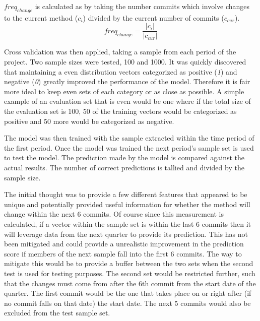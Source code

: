 $freq_{change}$ is calculated as by taking the number commits which involve changes to the current method ($c_i$) divided by the current number of commits ($c_{cur}$).
\begin{equation}
\label{eq:freq_change}
freq_{change} = \frac{|c_i|}{|c_{cur}|}
\end{equation}



Cross validation was then applied, taking a sample from each period of the project. Two sample sizes were tested, 100 and 1000. It was quickly discovered that maintaining a even distribution vectors categorized as positive (\textit{1}) and negative (\textit{0}) greatly improved the performance of the model. Therefore it is fair more ideal to keep even sets of each category or as close as possible. A simple example of an evaluation set that is even would be one where if the total size of the evaluation set is 100, 50 of the training vectors would be categorized as positive and 50 more would be categorized as negative.

The model was then trained with the sample extracted within the time period of the first period. Once the model was trained the next period's sample set is used to test the model. The prediction made by the model is compared against the actual results. The number of correct predictions is tallied and divided by the sample size. 


The initial thought was to provide a few different features that appeared to be unique and potentially provided useful information for whether the method will change within the next 6 commits. Of course since this measurement is calculated, if a vector within the sample set is within the last 6 commits then it will leverage data from the next quarter to provide its prediction. This has not been mitigated and could provide a unrealistic improvement in the prediction score if members of the next sample fall into the first 6 commits. The way to mitigate this would be to provide a buffer between the two sets when the second test is used for testing purposes. The second set would be restricted further, such that the changes must come from after the 6th commit from the start date of the quarter. The first commit would be the one that takes place on or right after (if no commit falls on that date) the start date. The next 5 commits would also be excluded from the test sample set.

